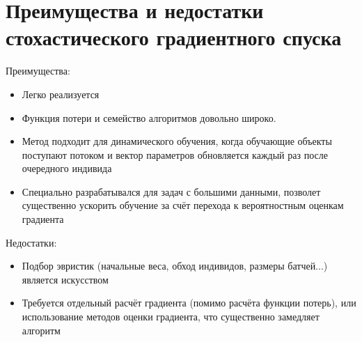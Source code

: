 \documentclass{article}
\begin{document}
\section{Преимущества и недостатки стохастического градиентного спуска}
Преимущества:
\begin{itemize}
    \item Легко реализуется
    \item Функция потери и семейство алгоритмов довольно широко. 
    \item Метод подходит для динамического обучения, когда обучающие объекты поступают потоком и вектор параметров обновляется каждый раз после очередного индивида
    \item Специально разрабатывался для задач с большими данными, позволет существенно ускорить обучение за счёт перехода к вероятностным оценкам градиента
\end{itemize}
Недостатки:
\begin{itemize}
    \item Подбор эвристик (начальные веса, обход индивидов, размеры батчей...) является искусством
    \item Требуется отдельный расчёт градиента (помимо расчёта функции потерь), или использование методов оценки градиента, что существенно замедляет алгоритм
\end{itemize}
\end{document}
